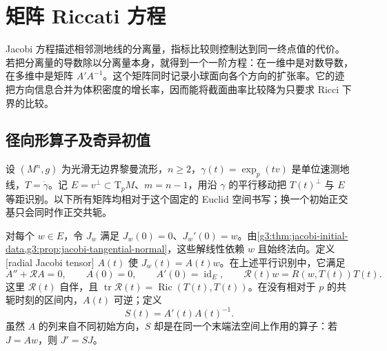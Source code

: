 
% 
% 

\section{矩阵 Riccati 方程}
\label{g3:sec:0702}

Jacobi 方程描述相邻测地线的分离量，指标比较则控制达到同一终点值的代价。若把分离量的导数除以分离量本身，就得到一个一阶方程：在一维中是对数导数，在多维中是矩阵 \(A'A^{-1}\)。这个矩阵同时记录小球面向各个方向的扩张率。它的迹把方向信息合并为体积密度的增长率，因而能将截面曲率比较降为只要求 Ricci 下界的比较。

\subsection{径向形算子及奇异初值}
\label{g3:subsec:0702:01}

设 \((M^n,g)\) 为光滑无边界黎曼流形，\(n\ge2\)，\(\gamma(t)=\exp_p(tv)\) 是单位速测地线，\(T=\dot\gamma\)。记 \(E=v^\perp\subset\mathrm T_pM\)、\(m=n-1\)，用沿 \(\gamma\) 的平行移动把 \(T(t)^\perp\) 与 \(E\) 等距识别。以下所有矩阵均相对于这个固定的 Euclid 空间书写；换一个初始正交基只会同时作正交共轭。

\ProseParagraphBreak

对每个 \(w\in E\)，令 \(J_w\) 满足 \(J_w(0)=0\)、\(J_w'(0)=w\)。由\cref{g3:thm:jacobi-initial-data,g3:prop:jacobi-tangential-normal}，这些解线性依赖 \(w\) 且始终法向。定义[radial Jacobi tensor] \(A(t)\) 使 \(J_w(t)=A(t)w\)。在上述平行识别中，它满足
\begin{equation}\label{g3:eq:radial-jacobi-tensor}
	A''+\mathcal R A=0,\qquad A(0)=0,\qquad A'(0)=\operatorname{id}_E,
	\qquad \mathcal R(t)w=R(w,T(t))T(t).
\end{equation}
这里 \(\mathcal R(t)\) 自伴，且 \(\operatorname{tr}\mathcal R(t)=\operatorname{Ric}(T(t),T(t))\)。在没有相对于 \(p\) 的共轭时刻的区间内，\(A(t)\) 可逆；定义
\[
	S(t)=A'(t)A(t)^{-1}.
\]
虽然 \(A\) 的列来自不同初始方向，\(S\) 却是在同一个末端法空间上作用的算子：若 \(J=A w\)，则 \(J'=SJ\)。

